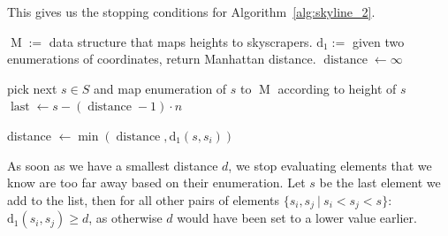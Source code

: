 \documentclass[a4paper,12pt,headsepline]{scrartcl}
\begin{document}
    This gives us the stopping conditions for Algorithm~\ref{alg:skyline_2}.
    \begin{algorithm}
    \caption{Skyline with pruning}
        \begin{algorithmic}[1]
            \State $\operatorname{M} := $ data structure that maps heights to skyscrapers.
            \State $\operatorname{d_1} := $ given two enumerations of coordinates, return Manhattan distance.
            \State $\operatorname{distance} \gets \infty$
            
                \State pick next $s \in S$ and map enumeration of $s$ to $\operatorname{M}$ according to height of $s$
                \State $\operatorname{last} \gets s - (\operatorname{distance}-1) \cdot n$
                
                    \State distance $\gets \min(\operatorname{distance}, \operatorname{d_1}(s, s_i))$
                \EndFor
            \EndWhile
        \end{algorithmic}
        \label{alg:skyline_2}
    \end{algorithm}
    As soon as we have a smallest distance $d$, we stop evaluating elements that we know are too far away based on their enumeration.
    Let $s$ be the last element we add to the list, then for all other pairs of elements $\{s_i,s_j \ \vert \ s_i < s_j < s\}$: $\operatorname{d_1}(s_i, s_j) \geq d$, as otherwise $d$ would have been set to a lower value earlier.
\end{document}

